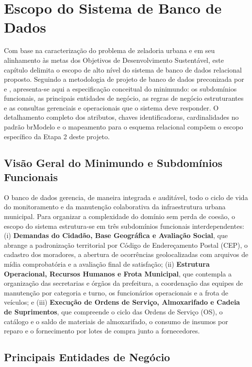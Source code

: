 \chapter{Escopo do Sistema de Banco de Dados}
\label{cap:escopo}

Com base na caracterização do problema de zeladoria urbana e em seu alinhamento às metas dos Objetivos de Desenvolvimento Sustentável, este capítulo delimita o escopo de alto nível do sistema de banco de dados relacional proposto. Seguindo a metodologia de projeto de banco de dados preconizada por  e , apresenta-se aqui a especificação conceitual do minimundo: os subdomínios funcionais, as principais entidades de negócio, as regras de negócio estruturantes e as consultas gerenciais e operacionais que o sistema deve responder. O detalhamento completo dos atributos, chaves identificadoras, cardinalidades no padrão brModelo e o mapeamento para o esquema relacional compõem o escopo específico da Etapa 2 deste projeto.

\section{Visão Geral do Minimundo e Subdomínios Funcionais}
\label{sec:subdominios}

O banco de dados gerencia, de maneira integrada e auditável, todo o ciclo de vida do monitoramento e da manutenção colaborativa da infraestrutura urbana municipal. Para organizar a complexidade do domínio sem perda de coesão, o escopo do sistema estrutura-se em três subdomínios funcionais interdependentes: (i) \textbf{Demandas do Cidadão, Base Geográfica e Avaliação Social}, que abrange a padronização territorial por Código de Endereçamento Postal (CEP), o cadastro dos moradores, a abertura de ocorrências geolocalizadas com arquivos de mídia comprobatória e a avaliação final de satisfação; (ii) \textbf{Estrutura Operacional, Recursos Humanos e Frota Municipal}, que contempla a organização das secretarias e órgãos da prefeitura, a coordenação das equipes de manutenção por categoria e turno, os funcionários operacionais e a frota de veículos; e (iii) \textbf{Execução de Ordens de Serviço, Almoxarifado e Cadeia de Suprimentos}, que compreende o ciclo das Ordens de Serviço (OS), o catálogo e o saldo de materiais de almoxarifado, o consumo de insumos por reparo e o fornecimento por lotes de compra junto a fornecedores.

\section{Principais Entidades de Negócio}
\label{sec:entidades-negocio}

